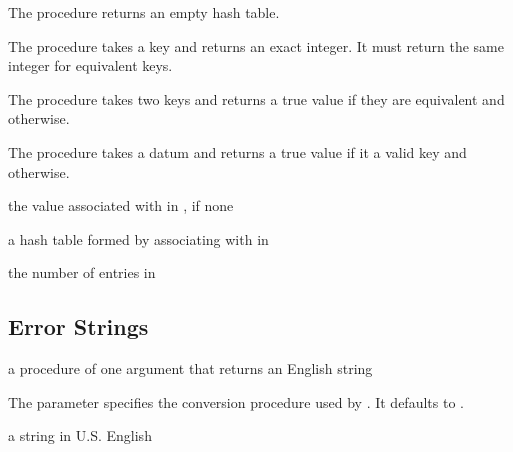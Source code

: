 The  procedure returns an empty hash table.

The  procedure takes a key and returns an exact
integer. It must return the same integer for equivalent keys.

The  procedure takes two keys and returns a true value
if they are equivalent and  otherwise.

The  procedure takes a datum and returns a true value
if it a valid key and  otherwise.

\begin{procedure}
\end{procedure}
\returns{} the value associated with  in ,
 if none

\begin{procedure}
\end{procedure}
\returns{} a hash table formed by associating  with 
in 

\begin{procedure}
\end{procedure}
\returns{} the number of entries in 

\subsection{Error Strings}

\begin{parameter}
\end{parameter}
\hasvalue{} a procedure of one argument that returns an English string

The  parameter specifies the
conversion procedure used by . It defaults
to .

\begin{procedure}
\end{procedure}
\returns{} a string in U.S. English


